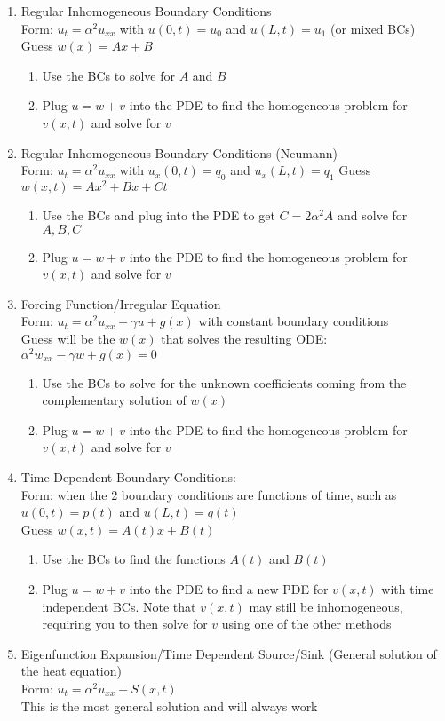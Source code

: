 \begin{enumerate}
    \item Regular Inhomogeneous Boundary Conditions\\
    Form: $u_t=\alpha^2u_{xx}$ with $u(0,t)=u_0$ and $u(L,t)=u_1$ (or mixed BCs)\\
    Guess $w(x)=Ax+B$
    \begin{enumerate}
        \item Use the BCs to solve for $A$ and $B$
        \item Plug $u=w+v$ into the PDE to find the homogeneous problem for $v(x,t)$ and solve for $v$
    \end{enumerate}
    \item Regular Inhomogeneous Boundary Conditions (Neumann)\\
    Form: $u_t=\alpha^2u_{xx}$ with $u_x(0,t)=q_0$ and $u_x(L,t)=q_1$
    Guess $w(x,t)=Ax^2+Bx+Ct$
    \begin{enumerate}
        \item Use the BCs and plug into the PDE to get $C=2\alpha^2A$ and solve for $A,B,C$
        \item Plug $u=w+v$ into the PDE to find the homogeneous problem for $v(x,t)$ and solve for $v$
    \end{enumerate}
    \item Forcing Function/Irregular Equation\\
    Form: $u_t=\alpha^2u_{xx}-\gamma u+g(x)$ with constant boundary conditions\\
    Guess will be the $w(x)$ that solves the resulting ODE: $\alpha^2w_{xx}-\gamma w+g(x)=0$
    \begin{enumerate}
        \item Use the BCs to solve for the unknown coefficients coming from the complementary solution of $w(x)$
        \item Plug $u=w+v$ into the PDE to find the homogeneous problem for $v(x,t)$ and solve for $v$
    \end{enumerate}
    \item Time Dependent Boundary Conditions:\\
    Form: when the 2 boundary conditions are functions of time, such as $u(0,t)=p(t)$ and $u(L,t)=q(t)$\\
    Guess $w(x,t)=A(t)x+B(t)$
    \begin{enumerate}
        \item Use the BCs to find the functions $A(t)$ and $B(t)$
        \item Plug $u=w+v$ into the PDE to find a new PDE for $v(x,t)$ with time independent BCs. Note that $v(x,t)$ may still be inhomogeneous, requiring you to then solve for $v$ using one of the other methods
    \end{enumerate}
    \item Eigenfunction Expansion/Time Dependent Source/Sink (General solution of the heat equation)\\
    Form: $u_t=\alpha^2u_{xx}+S(x,t)$\\
    This is the most general solution and will always work


\end{enumerate}
